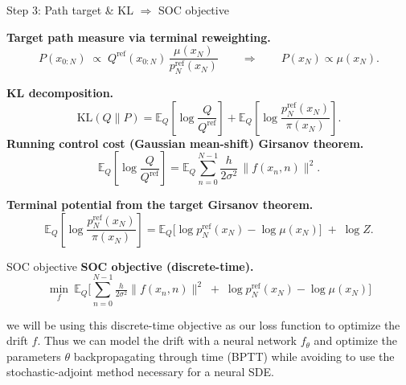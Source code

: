 \documentclass[aspectratio=169,xcolor=dvipsnames]{beamer}
\begin{document}
\begin{frame}[t]{Step 3: Path target \& KL $\Rightarrow$ SOC objective}
\scriptsize


\textbf{Target path measure via terminal reweighting.}
\[
P(x_{0:N}) \;\propto\; Q^{\text{ref}}(x_{0:N})\,\frac{\mu(x_N)}{p^{\text{ref}}_N(x_N)}
\qquad\Longrightarrow\qquad P(x_N)\propto\mu(x_N).
\]

\textbf{KL decomposition.}
\[
\mathrm{KL}(Q\|P)
=\mathbb E_{Q}\!\left[\log\frac{Q}{Q^{\text{ref}}}\right]
+\mathbb E_{Q}\!\left[\log\frac{p^{\text{ref}}_N(x_N)}{\pi(x_N)}\right].
\]
\medskip
\textbf{Running control cost (Gaussian mean-shift) Girsanov theorem.}
\[
\mathbb E_{Q}\!\left[\log\frac{Q}{Q^{\text{ref}}}\right]
=\mathbb E_Q \sum_{n=0}^{N-1}\frac{h}{2\sigma^2}\,\|f(x_n,n)\|^2.
\]

\textbf{Terminal potential from the target Girsanov theorem.}
\[
\mathbb E_{Q}\!\left[\log\frac{p^{\text{ref}}_N(x_N)}{\pi(x_N)}\right]
=\mathbb E_Q\!\big[\log p^{\text{ref}}_N(x_N)-\log \mu(x_N)\big]\;+\;\log Z.
\]

\end{frame}

\begin{frame}[t]{SOC objective}
\footnotesize
\medskip
\textbf{SOC objective (discrete-time).}
\[
\boxed{\ \min_{f}\ \mathbb E_Q\!\Big[\sum_{n=0}^{N-1}\tfrac{h}{2\sigma^2}\|f(x_n,n)\|^2\;+\;\log p^{\text{ref}}_N(x_N)-\log \mu(x_N)\Big]\ }
\]

we will be using this discrete-time objective as our loss function to optimize the drift $f$. Thus we can model the drift with a neural network $f_\theta$ and optimize the parameters $\theta$ backpropagating through time (BPTT) while avoiding to use the stochastic-adjoint method necessary for a neural SDE.
\end{frame}


\end{document}
